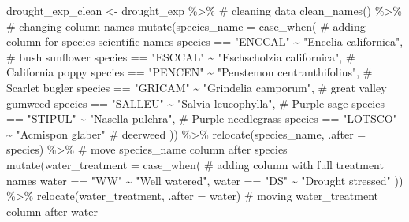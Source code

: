 \documentclass[
  letterpaper,
  DIV=11,
  numbers=noendperiod]{scrartcl}
\newenvironment{Shaded}{\begin{snugshade}}{\end{snugshade}}
\newcommand{\AttributeTok}[1]{\textcolor[rgb]{0.40,0.45,0.13}{#1}}
\newcommand{\CommentTok}[1]{\textcolor[rgb]{0.37,0.37,0.37}{#1}}
\newcommand{\FunctionTok}[1]{\textcolor[rgb]{0.28,0.35,0.67}{#1}}
\newcommand{\NormalTok}[1]{\textcolor[rgb]{0.00,0.23,0.31}{#1}}
\newcommand{\OtherTok}[1]{\textcolor[rgb]{0.00,0.23,0.31}{#1}}
\newcommand{\SpecialCharTok}[1]{\textcolor[rgb]{0.37,0.37,0.37}{#1}}
\newcommand{\StringTok}[1]{\textcolor[rgb]{0.13,0.47,0.30}{#1}}
\begin{document}
\begin{Shaded}
\begin{Highlighting}[]
\NormalTok{drought\_exp\_clean }\OtherTok{\textless{}{-}}\NormalTok{ drought\_exp }\SpecialCharTok{\%\textgreater{}\%} \CommentTok{\# cleaning data}
  \FunctionTok{clean\_names}\NormalTok{() }\SpecialCharTok{\%\textgreater{}\%} \CommentTok{\# changing column names}
  \FunctionTok{mutate}\NormalTok{(}\AttributeTok{species\_name =} \FunctionTok{case\_when}\NormalTok{( }\CommentTok{\# adding column for species scientific names}
\NormalTok{    species }\SpecialCharTok{==} \StringTok{"ENCCAL"} \SpecialCharTok{\textasciitilde{}} \StringTok{"Encelia californica"}\NormalTok{, }\CommentTok{\# bush sunflower}
\NormalTok{    species }\SpecialCharTok{==} \StringTok{"ESCCAL"} \SpecialCharTok{\textasciitilde{}} \StringTok{"Eschscholzia californica"}\NormalTok{, }\CommentTok{\# California poppy}
\NormalTok{    species }\SpecialCharTok{==} \StringTok{"PENCEN"} \SpecialCharTok{\textasciitilde{}} \StringTok{"Penstemon centranthifolius"}\NormalTok{, }\CommentTok{\# Scarlet bugler}
\NormalTok{    species }\SpecialCharTok{==} \StringTok{"GRICAM"} \SpecialCharTok{\textasciitilde{}} \StringTok{"Grindelia camporum"}\NormalTok{, }\CommentTok{\# great valley gumweed}
\NormalTok{    species }\SpecialCharTok{==} \StringTok{"SALLEU"} \SpecialCharTok{\textasciitilde{}} \StringTok{"Salvia leucophylla"}\NormalTok{, }\CommentTok{\# Purple sage}
\NormalTok{    species }\SpecialCharTok{==} \StringTok{"STIPUL"} \SpecialCharTok{\textasciitilde{}} \StringTok{"Nasella pulchra"}\NormalTok{, }\CommentTok{\# Purple needlegrass}
\NormalTok{    species }\SpecialCharTok{==} \StringTok{"LOTSCO"} \SpecialCharTok{\textasciitilde{}} \StringTok{"Acmispon glaber"} \CommentTok{\# deerweed}
\NormalTok{  )) }\SpecialCharTok{\%\textgreater{}\%} 
  \FunctionTok{relocate}\NormalTok{(species\_name, }\AttributeTok{.after =}\NormalTok{ species) }\SpecialCharTok{\%\textgreater{}\%} \CommentTok{\# move species\_name column after species}
  \FunctionTok{mutate}\NormalTok{(}\AttributeTok{water\_treatment =} \FunctionTok{case\_when}\NormalTok{( }\CommentTok{\# adding column with full treatment names}
\NormalTok{    water }\SpecialCharTok{==} \StringTok{"WW"} \SpecialCharTok{\textasciitilde{}} \StringTok{"Well watered"}\NormalTok{,}
\NormalTok{    water }\SpecialCharTok{==} \StringTok{"DS"} \SpecialCharTok{\textasciitilde{}} \StringTok{"Drought stressed"}
\NormalTok{  )) }\SpecialCharTok{\%\textgreater{}\%} 
  \FunctionTok{relocate}\NormalTok{(water\_treatment, }\AttributeTok{.after =}\NormalTok{ water) }\CommentTok{\# moving water\_treatment column after water}


\end{Highlighting}
\end{Shaded}
\end{document}
